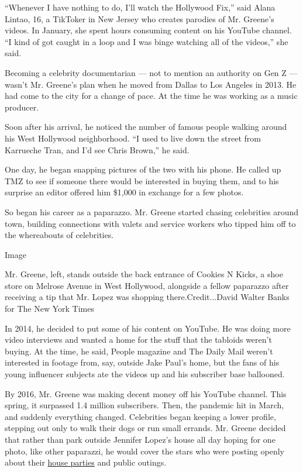 ``Whenever I have nothing to do, I'll watch the Hollywood Fix,'' said
Alana Lintao, 16, a TikToker in New Jersey who creates parodies of Mr.
Greene's videos. In January, she spent hours consuming content on his
YouTube channel. ``I kind of got caught in a loop and I was binge
watching all of the videos,'' she said.

Becoming a celebrity documentarian --- not to mention an authority on
Gen Z --- wasn't Mr. Greene's plan when he moved from Dallas to Los
Angeles in 2013. He had come to the city for a change of pace. At the
time he was working as a music producer.

Soon after his arrival, he noticed the number of famous people walking
around his West Hollywood neighborhood. ``I used to live down the street
from Karrueche Tran, and I'd see Chris Brown,'' he said.

One day, he began snapping pictures of the two with his phone. He called
up TMZ to see if someone there would be interested in buying them, and
to his surprise an editor offered him \$1,000 in exchange for a few
photos.

So began his career as a paparazzo. Mr. Greene started chasing
celebrities around town, building connections with valets and service
workers who tipped him off to the whereabouts of celebrities.

Image

Mr. Greene, left, stands outside the back entrance of Cookies N Kicks, a
shoe store on Melrose Avenue in West Hollywood, alongside a fellow
paparazzo after receiving a tip that Mr. Lopez was shopping
there.Credit...David Walter Banks for The New York Times

In 2014, he decided to put some of his content on YouTube. He was doing
more video interviews and wanted a home for the stuff that the tabloids
weren't buying. At the time, he said, People magazine and The Daily Mail
weren't interested in footage from, say, outside Jake Paul's home, but
the fans of his young influencer subjects ate the videos up and his
subscriber base ballooned.

By 2016, Mr. Greene was making decent money off his YouTube channel.
This spring, it surpassed 1.4 million subscribers. Then, the pandemic
hit in March, and suddenly everything changed. Celebrities began keeping
a lower profile, stepping out only to walk their dogs or run small
errands. Mr. Greene decided that rather than park outside Jennifer
Lopez's house all day hoping for one photo, like other paparazzi, he
would cover the stars who were posting openly about their
\href{https://www.nytimes3xbfgragh.onion/2020/08/06/style/influencer-parties-jake-paul-tana-mongeau-thomas-petrou-hype-house.html}{house
parties} and public outings.


